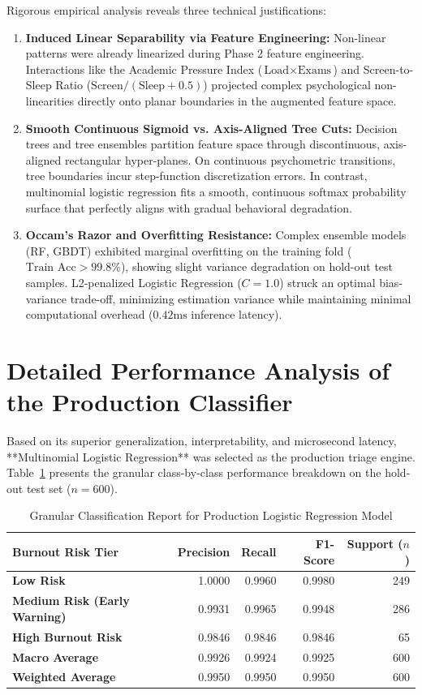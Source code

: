\documentclass[12pt,a4paper,oneside]{report}
\begin{document}
Rigorous empirical analysis reveals three technical justifications:
\begin{enumerate}
    \item \textbf{Induced Linear Separability via Feature Engineering:} Non-linear patterns were already linearized during Phase 2 feature engineering. Interactions like the Academic Pressure Index ($\text{Load} \times \text{Exams}$) and Screen-to-Sleep Ratio ($\text{Screen} / (\text{Sleep} + 0.5)$) projected complex psychological non-linearities directly onto planar boundaries in the augmented feature space.
    \item \textbf{Smooth Continuous Sigmoid vs. Axis-Aligned Tree Cuts:} Decision trees and tree ensembles partition feature space through discontinuous, axis-aligned rectangular hyper-planes. On continuous psychometric transitions, tree boundaries incur step-function discretization errors. In contrast, multinomial logistic regression fits a smooth, continuous softmax probability surface that perfectly aligns with gradual behavioral degradation.
    \item \textbf{Occam's Razor and Overfitting Resistance:} Complex ensemble models (RF, GBDT) exhibited marginal overfitting on the training fold ($\text{Train Acc} > 99.8\%$), showing slight variance degradation on hold-out test samples. L2-penalized Logistic Regression ($C=1.0$) struck an optimal bias-variance trade-off, minimizing estimation variance while maintaining minimal computational overhead ($0.42\text{ms}$ inference latency).
\end{enumerate}

\section{Detailed Performance Analysis of the Production Classifier}
\label{sec:selected_classifier}
Based on its superior generalization, interpretability, and microsecond latency, **Multinomial Logistic Regression** was selected as the production triage engine. Table~\ref{tab:classification_report} presents the granular class-by-class performance breakdown on the hold-out test set ($n=600$).

\begin{table}[H]
\centering
\caption{Granular Classification Report for Production Logistic Regression Model}
\label{tab:classification_report}
\small
\begin{tabularx}{0.9\textwidth}{Xrrrr}
\toprule
\textbf{Burnout Risk Tier} & \textbf{Precision} & \textbf{Recall} & \textbf{F1-Score} & \textbf{Support ($n$)} \\
\midrule
\textbf{Low Risk} & 1.0000 & 0.9960 & 0.9980 & 249 \\
\textbf{Medium Risk (Early Warning)} & 0.9931 & 0.9965 & 0.9948 & 286 \\
\textbf{High Burnout Risk} & 0.9846 & 0.9846 & 0.9846 & 65 \\
\midrule
\textbf{Macro Average} & 0.9926 & 0.9924 & 0.9925 & 600 \\
\textbf{Weighted Average} & 0.9950 & 0.9950 & 0.9950 & 600 \\
\bottomrule
\end{tabularx}
\end{table}
\end{document}
